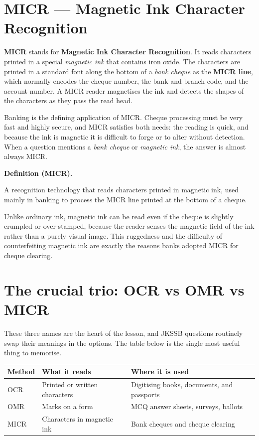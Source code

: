 \documentclass[11pt]{article}
\newenvironment{definitionbox}[1]{%
  \par\noindent\textbf{Definition (#1).}\ \itshape
}{\par\vspace{0.3em}}
\begin{document}
\section{MICR --- Magnetic Ink Character Recognition}
\textbf{MICR} stands for \textbf{Magnetic Ink Character Recognition}. It
reads characters printed in a special \emph{magnetic ink} that contains iron
oxide. The characters are printed in a standard font along the bottom of a
\emph{bank cheque} as the \textbf{MICR line}, which normally encodes the
cheque number, the bank and branch code, and the account number. A MICR
reader magnetises the ink and detects the shapes of the characters as they
pass the read head.

Banking is the defining application of MICR. Cheque processing must be very
fast and highly secure, and MICR satisfies both needs: the reading is quick,
and because the ink is magnetic it is difficult to forge or to alter without
detection. When a question mentions a \emph{bank cheque} or \emph{magnetic
ink}, the answer is almost always MICR.

\begin{definitionbox}{MICR}
A recognition technology that reads characters printed in magnetic ink,
used mainly in banking to process the MICR line printed at the bottom of a
cheque.
\end{definitionbox}

Unlike ordinary ink, magnetic ink can be read even if the cheque is slightly
crumpled or over-stamped, because the reader senses the magnetic field of
the ink rather than a purely visual image. This ruggedness and the difficulty
of counterfeiting magnetic ink are exactly the reasons banks adopted MICR
for cheque clearing.

\section{The crucial trio: OCR vs OMR vs MICR}
These three names are the heart of the lesson, and JKSSB questions routinely
swap their meanings in the options. The table below is the single most useful
thing to memorise.

\begin{center}
\begin{tabular}{p{}p{}p{}}
\toprule
\textbf{Method} & \textbf{What it reads} & \textbf{Where it is used} \\
\midrule
OCR & Printed or written characters & Digitising books, documents, and passports \\
OMR & Marks on a form & MCQ answer sheets, surveys, ballots \\
MICR & Characters in magnetic ink & Bank cheques and cheque clearing \\
\bottomrule
\end{tabular}
\end{center}
\end{document}
